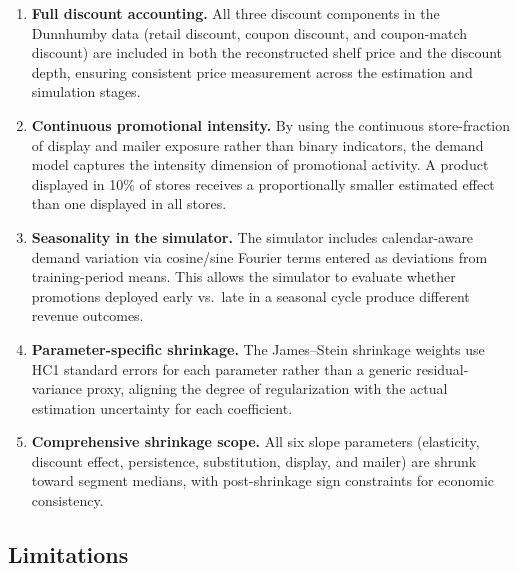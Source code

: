 \documentclass[12pt,a4paper]{article}
\begin{document}
\begin{enumerate}[nosep]
\item \textbf{Full discount accounting.} All three discount
components in the Dunnhumby data (retail discount, coupon discount,
and coupon-match discount) are included in both the reconstructed
shelf price and the discount depth, ensuring consistent price
measurement across the estimation and simulation stages.

\item \textbf{Continuous promotional intensity.} By using the
continuous store-fraction of display and mailer exposure rather
than binary indicators, the demand model captures the intensity
dimension of promotional activity. A product displayed in 10\%
of stores receives a proportionally smaller estimated effect than
one displayed in all stores.

\item \textbf{Seasonality in the simulator.} The simulator includes
calendar-aware demand variation via cosine/sine Fourier terms
entered as deviations from training-period means. This allows the
simulator to evaluate whether promotions deployed early vs.\ late
in a seasonal cycle produce different revenue outcomes.

\item \textbf{Parameter-specific shrinkage.} The James--Stein
shrinkage weights use HC1 standard errors for each parameter rather
than a generic residual-variance proxy, aligning the degree of
regularization with the actual estimation uncertainty for each
coefficient.

\item \textbf{Comprehensive shrinkage scope.} All six slope
parameters (elasticity, discount effect, persistence, substitution,
display, and mailer) are shrunk toward segment medians, with
post-shrinkage sign constraints for economic consistency.
\end{enumerate}

\subsection{Limitations}
\end{document}
